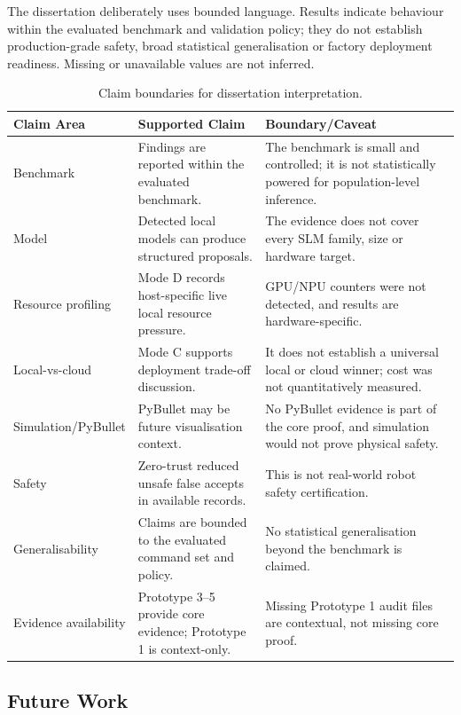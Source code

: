 \documentclass[sigconf,nonacm]{acmart}
\begin{document}
The dissertation deliberately uses bounded language. Results indicate behaviour within the evaluated benchmark and validation policy; they do not establish production-grade safety, broad statistical generalisation or factory deployment readiness. Missing or unavailable values are not inferred.

\begin{table}[t]
\centering
\caption{Claim boundaries for dissertation interpretation.}
\label{tab:claim_boundaries}
\footnotesize
\begin{tabularx}{\textwidth}{L{0.18\textwidth}Y Y}
\toprule
Claim Area & Supported Claim & Boundary/Caveat \\
\midrule
Benchmark & Findings are reported within the evaluated benchmark. & The benchmark is small and controlled; it is not statistically powered for population-level inference. \\
Model & Detected local models can produce structured proposals. & The evidence does not cover every SLM family, size or hardware target. \\
Resource profiling & Mode D records host-specific live local resource pressure. & GPU/NPU counters were not detected, and results are hardware-specific. \\
Local-vs-cloud & Mode C supports deployment trade-off discussion. & It does not establish a universal local or cloud winner; cost was not quantitatively measured. \\
Simulation/PyBullet & PyBullet may be future visualisation context. & No PyBullet evidence is part of the core proof, and simulation would not prove physical safety. \\
Safety & Zero-trust reduced unsafe false accepts in available records. & This is not real-world robot safety certification. \\
Generalisability & Claims are bounded to the evaluated command set and policy. & No statistical generalisation beyond the benchmark is claimed. \\
Evidence availability & Prototype 3--5 provide core evidence; Prototype 1 is context-only. & Missing Prototype 1 audit files are contextual, not missing core proof. \\
\bottomrule
\end{tabularx}
\end{table}

\subsection{Future Work}
\label{sec:future_work}
\end{document}
